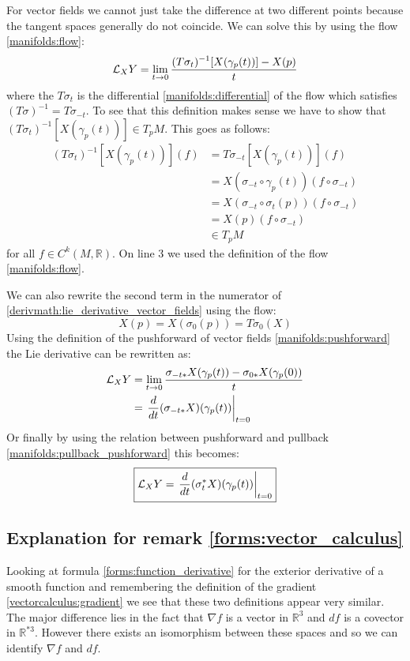 	For vector fields we cannot just take the difference at two different points because the tangent spaces generally do not coincide. We can solve this by using the flow \ref{manifolds:flow}:
	\begin{equation}
		\label{derivmath:lie_derivative_vector_fields}
		\mathcal{L}_XY = \lim_{t\rightarrow0}\stylefrac{(T\sigma_t)^{-1}[X(\gamma_p(t))] - X(p)}{t}
	\end{equation}
	where the $T\sigma_t$ is the differential \ref{manifolds:differential} of the flow which satisfies $(T\sigma)^{-1} = T\sigma_{-t}$. To see that this definition makes sense we have to show that $(T\sigma_t)^{-1}[X(\gamma_p(t))]\in T_pM$. This goes as follows:
	\begin{align*}
		(T\sigma_t)^{-1}[X(\gamma_p(t))](f) &= T\sigma_{-t}[X(\gamma_p(t))](f)\\
		&= X(\sigma_{-t}\circ\gamma_p(t))(f\circ\sigma_{-t})\\
		&= X(\sigma_{-t}\circ\sigma_t(p))(f\circ\sigma_{-t})\\
		&= X(p)(f\circ\sigma_{-t})\\
		&\in T_pM
	\end{align*}
	for all $f\in C^k(M, \mathbb{R})$. On line 3 we used the definition of the flow \ref{manifolds:flow}.
		
	We can also rewrite the second term in the numerator of \ref{derivmath:lie_derivative_vector_fields} using the flow:
	\[
		X(p) = X(\sigma_0(p)) = T\sigma_0(X)
	\]
	Using the definition of the pushforward of vector fields \ref{manifolds:pushforward} the Lie derivative can be rewritten as:
	\begin{align*}
		\mathcal{L}_XY &= \lim_{t\rightarrow0}\stylefrac{\sigma_{-t*}X(\gamma_p(t)) - \sigma_{0*}X(\gamma_p(0))}{t}\\
		&= \left.\deriv{}{t}(\sigma_{-t*}X)(\gamma_p(t))\right|_{t=0}
	\end{align*}
	Or finally by using the relation between pushforward and pullback \ref{manifolds:pullback_pushforward} this becomes:
	\begin{equation}
		\boxed{\mathcal{L}_XY = \left.\frac{d}{dt}(\sigma_t^*X)(\gamma_p(t))\right|_{t=0}}
	\end{equation}
		 
\subsection{Explanation for remark \ref{forms:vector_calculus}}

Looking at formula \ref{forms:function_derivative} for the exterior derivative of a smooth function and remembering the definition of the gradient \ref{vectorcalculus:gradient} we see that these two definitions appear very similar. The major difference lies in the fact that $\nabla f$ is a vector in $\mathbb{R}^3$ and $df$ is a covector in $\mathbb{R}^{*3}$. However there exists an isomorphism between these spaces and so we can identify $\nabla f$ and $df$.
		
